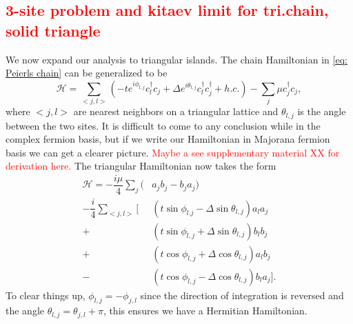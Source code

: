 \documentclass[aps,prb,showpacs,twocolumn,amsmath,amssymb,superscriptaddress]{revtex4-2}
\newcommand{\Red}[1]{\textcolor{red}{#1}}
\newcommand{\Ham}{\mathcal{H}}
\newcommand{\cc}{c^{\dagger}}
\newcommand{\de}{\Delta}
\begin{document}
\subsection{\Red{3-site problem and kitaev limit for tri.chain, solid triangle}}
We now expand our analysis to triangular islands.
The chain Hamiltonian in \ref{eq: Peierls chain} can be generalized to be
\begin{equation} \label{eq: Peierls triangle}
  \Ham = \sum_{<j,l>} (-t e^{i\phi_{l,j}} \cc_{l} c_j + \de e^{i\theta_{l,j}} \cc_{l}\cc_j + h.c.) - \sum_j \mu \cc_j c_j,
\end{equation}
where $<j,l>$ are nearest neighbors on a triangular lattice and $\theta_{l,j}$ is the angle between the two sites.
It is difficult to come to any conclusion while in the complex fermion basis, but if we write our Hamiltonian in Majorana fermion basis we can get a clearer picture.
\Red{Maybe a see supplementary material XX for derivation here.}
The triangular Hamiltonian now takes the form
\begin{align}
  \Ham = -\dfrac{i\mu}{4} \sum_j (& a_j b_j - b_j a_j) \nonumber \\
  -\dfrac{i}{4} \sum_{<j,l>} [&(t\sin\phi_{l.j}-\de\sin\theta_{l,j}) a_l a_j \nonumber \\
  +&(t\sin\phi_{l,j}+\de\sin\theta_{l,j}) b_l b_j \nonumber \\
  +&(t\cos\phi_{l,j}+\de\cos\theta_{l,j}) a_l b_j \nonumber \\
  -&(t\cos\phi_{l,j}-\de\cos\theta_{l,j}) b_l a_j].
\end{align}
To clear things up, $\phi_{l,j} = -\phi_{j,l}$ since the direction of integration is reversed and the angle $\theta_{l,j} = \theta_{j,l} + \pi$, this ensures we have a Hermitian Hamiltonian.
\end{document}
